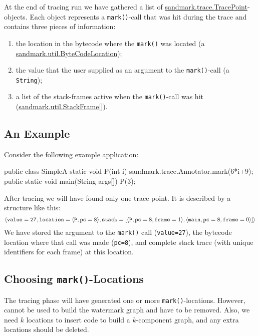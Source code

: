 At the end of tracing run we have gathered a list of
\url{sandmark.trace.TracePoint}-objects. Each object
represents a {\tt mark()}-call that was hit during
the trace and contains three pieces of information:
\begin{enumerate}
   \item the location in the bytecode where the {\tt mark()}
         was located (a \url{sandmark.util.ByteCodeLocation});
   \item the value that the user supplied as an argument to
         the {\tt mark()}-call (a {\tt String});
   \item a list of the stack-frames active when the {\tt mark()}-call
         was hit (\url{sandmark.util.StackFrame[]}).
\end{enumerate}

\subsection{An Example}
Consider the following example application:
\begin{listing}{1}
   public class SimpleA {
      static void P(int i) {
         sandmark.trace.Annotator.mark(6*i+9);
      }
      public static void main(String args[]) {
         P(3);
      }
   }
\end{listing}
After tracing we will have found only one trace point. It is described
by a structure like this:
$$
\langle 
   {\tt value=27},
   {\tt location}=\langle {\tt P},{\tt pc}=8\rangle, 
   {\tt stack}=[
      \langle {\tt P},{\tt pc}=8,{\tt frame}=1\rangle,
      \langle {\tt main},{\tt pc}=8,{\tt frame}=0\rangle
   ]
\rangle
$$
We have stored the argument to the {\tt mark()} call
({\tt value=27}), the bytecode location where that call 
was made ({\tt pc=8}), and complete stack trace 
(with unique identifiers for each frame) at this location.


\subsection{Choosing {\tt mark()}-Locations}
The tracing phase will have generated one or more
{\tt mark()}-locations. However, cannot be used 
to build the watermark graph and have to be removed.
Also, we need $k$ locations to insert code to
build a $k$-component graph, and any extra
locations should be deleted.

